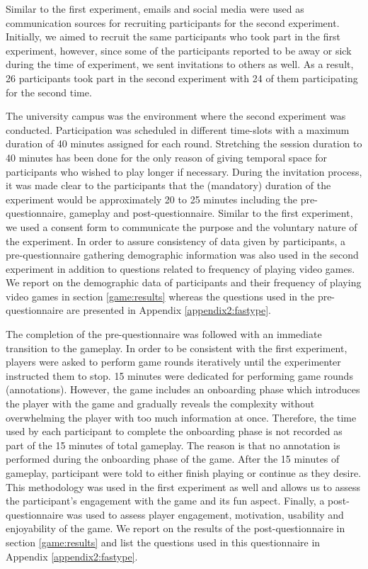 Similar to the first experiment, emails and social media were used as communication sources for recruiting participants for the second experiment. Initially, we aimed to recruit the same participants who took part in the first experiment, however, since some of the participants reported to be away or sick during the time of experiment, we sent invitations to others as well. As a result, 26 participants took part in the second experiment with 24 of them participating for the second time. 

The university campus was the environment where the second experiment was conducted. Participation was scheduled in different time-slots with a maximum duration of 40 minutes assigned for each round. Stretching the session duration to 40 minutes has been done for the only reason of giving temporal space for participants who wished to play longer if necessary. During the invitation process, it was made clear to the participants that the (mandatory) duration of the experiment would be approximately 20 to 25 minutes including the pre-questionnaire, gameplay and post-questionnaire. Similar to the first experiment, we used a consent form to communicate the purpose and the voluntary nature of the experiment. In order to assure consistency of data given by participants, a pre-questionnaire gathering demographic information was also used in the second experiment in addition to questions related to frequency of playing video games. We report on the demographic data of participants and their frequency of playing video games in section \ref{game:results} whereas the questions used in the pre-questionnaire are presented in Appendix \ref{appendix2:fastype}. 

The completion of the pre-questionnaire was followed with an immediate transition to the gameplay. In order to be consistent with the first experiment, players were asked to perform game rounds iteratively until the experimenter instructed them to stop. 15 minutes were dedicated for performing game rounds (annotations). However, the game includes an onboarding phase which introduces the player with the game and gradually reveals the complexity without overwhelming the player with too much information at once. Therefore, the time used by each participant to complete the onboarding phase is not recorded as part of the 15 minutes of total gameplay. The reason is that no annotation is performed during the onboarding phase of the game. After the 15 minutes of gameplay, participant were told to either finish playing or continue as they desire. This methodology was used in the first experiment as well and allows us to assess the participant's engagement with the game and its fun aspect. Finally, a post-questionnaire was used to assess player engagement, motivation, usability and enjoyability of the game. We report on the results of the post-questionnaire in section \ref{game:results} and list the questions used in this questionnaire in Appendix \ref{appendix2:fastype}.

